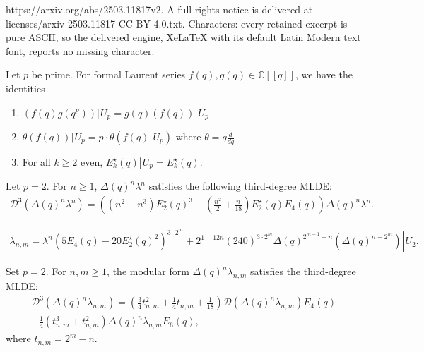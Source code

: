 \documentclass[10pt,a4paper]{amsart}
\newcommand{\haupt}{\lambda}
\newcommand{\upee}[1]{\left. #1 \right\rvert \hspace{1pt} U_{p}}
\newcommand{\utwo}[1]{\left. #1 \right\rvert \hspace{1pt} U_{2}}
\begin{document}
https://arxiv.org/abs/2503.11817v2. A full rights notice is delivered at licenses/arxiv-2503.11817-CC-BY-4.0.txt. Characters: every retained excerpt is pure ASCII, so the delivered engine, XeLaTeX with its default Latin Modern text font, reports no missing character.
\begin{Lemma} \label{Lemma: Upoperator}
    Let $p$ be prime. For formal Laurent series $f(q), g(q) \in \mathbb{C}[[q]]$, we have the identities
    \begin{enumerate}
        \item $\upee{ \left( f(q) g(q^{p}) \right) } =  g (q) \upee{ \left( f (q) \right) }$
        \item $\upee{ \theta (f(q)) } = p \cdot \theta \left( \upee{ f(q) }  \right)$ where $\theta = q \frac{d}{dq}$
        \item For all $k \geq 2$ even, $\upee{ E_{k}^{\star}(q) }= E_{k}^{\star}(q)$.
    \end{enumerate}
\end{Lemma}

\begin{Lemma} \label{Lemma: hdiffeq}
Let $p=2$. For $n \geq 1$, $\Delta (q)^{n} \haupt^{n}$ satisfies the following third-degree MLDE:
\begin{align}
    \mathcal{D}^{3} \left( \Delta (q)^{n} \haupt^{n} \right) = \left( \left( n^{2} - n^{3} \right) E_{2}^{\star}(q)^{3} - \left( \frac{n^{2}}{2} + \frac{n}{18} \right) E_{2}^{\star}(q)E_{4}(q) \right) \Delta (q)^{n} \haupt^{n}.\label{hdiffeq}
\end{align}
\end{Lemma}

\begin{align}
    \haupt_{n,m} = \haupt^{n}  \left( 5E_{4}(q) - 20 E_{2}^{\star}(q)^{2} \right)^{3 \cdot 2^{m}} + 2^{1 - 12n} (240)^{3 \cdot 2^{m}} \Delta (q)^{2^{m+1}-n} \utwo{\left( \Delta (q)^{n-2^{m}} \right) }. \label{hmsbetter}
\end{align}

\begin{Prop} \label{Prop: hmdiffs}
    Set $p=2$. For $n,m \geq 1$, the modular form $\Delta (q)^{n} \haupt_{n,m}$ satisfies the third-degree MLDE:
    \begin{multline}
        \mathcal{D}^{3} ( \Delta (q)^{n} \haupt_{n,m}) = \left( \frac{3}{4}t_{n,m}^{2} + \frac{1}{4}t_{n,m} + \frac{1}{18} \right) \mathcal{D}(\Delta (q)^{n} \haupt_{n,m}) E_{4}(q) \\ - \frac{1}{4} \left( t_{n,m}^{3} + t_{n,m}^{2} \right) \Delta (q)^{n}\haupt_{n,m} E_{6}(q),
    \end{multline}
    where $t_{n,m} = 2^{m}-n$.
\end{Prop}
\end{document}
